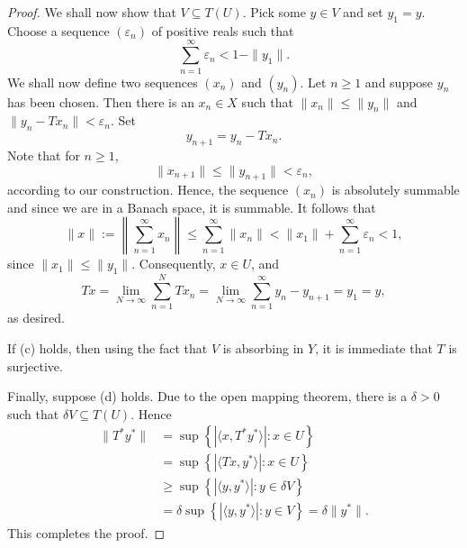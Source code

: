 \begin{proof}
    We shall now show that $V\subseteq T(U)$. Pick some $y\in V$ and set $y_1 = y$. Choose a sequence $(\varepsilon_n)$ of positive reals such that 
    \begin{equation*}
        \sum_{n = 1}^\infty \varepsilon_n < 1 - \|y_1\|.
    \end{equation*}
    We shall now define two sequences $(x_n)$ and $(y_n)$. Let $n\ge 1$ and suppose $y_n$ has been chosen. Then there is an $x_n\in X$ such that $\|x_n\|\le \|y_n\|$ and $\|y_n - Tx_n\| < \varepsilon_n$. Set 
    \begin{equation*}
        y_{n + 1} = y_n - Tx_n.
    \end{equation*}
    Note that for $n\ge 1$,
    \begin{equation*}
        \|x_{n + 1}\|\le \|y_{n + 1}\| < \varepsilon_n,
    \end{equation*}
    according to our construction. Hence, the sequence $(x_n)$ is absolutely summable and since we are in a Banach space, it is summable. It follows that 
    \begin{equation*}
        \|x\| := \left\|\sum_{n = 1}^\infty x_n\right\|\le\sum_{n = 1}^\infty\|x_n\| < \|x_1\| + \sum_{n = 1}^\infty \varepsilon_n < 1,
    \end{equation*}
    since $\|x_1\|\le \|y_1\|$. Consequently, $x\in U$, and 
    \begin{equation*}
        Tx = \lim_{N\to\infty}\sum_{n = 1}^N Tx_n = \lim_{N\to\infty}\sum_{n = 1}^\infty y_n - y_{n + 1} = y_1 = y,
    \end{equation*}
    as desired.

    If (c) holds, then using the fact that $V$ is absorbing in $Y$, it is immediate that $T$ is surjective.

    Finally, suppose (d) holds. Due to the open mapping theorem, there is a $\delta > 0$ such that $\delta V\subseteq T(U)$. Hence 
    \begin{align*}
        \|T^\ast y^\ast\| &= \sup\left\{|\langle x, T^\ast y^\ast\rangle|\colon x\in U\right\}\\
        &= \sup\left\{|\langle Tx, y^\ast\rangle|\colon x\in U\right\}\\
        &\ge\sup\left\{|\langle y, y^\ast\rangle|\colon y\in\delta V\right\}\\
        &= \delta\sup\left\{|\langle y, y^\ast\rangle|\colon y\in V\right\} = \delta\|y^\ast\|.
    \end{align*}
    This completes the proof.
\end{proof}

